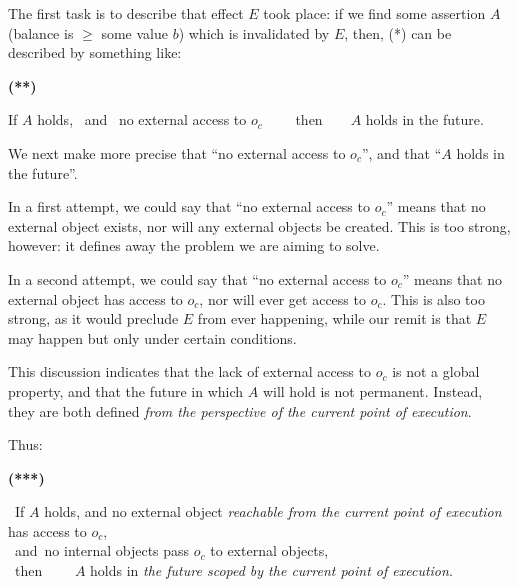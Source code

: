 
\noindent 
The first task is to describe that effect  $E$ took place: if we  find  some assertion $A$ (\eg  balance is $\geq$ some value $b$)
which is invalidated by $E$, then, (*) can be described by something like:

\vspace{.1cm}

  \begin{minipage}{.05\textwidth}
   \textbf{(**)}
\end{minipage}
\hfill
\begin{minipage}{.95\textwidth}
\begin{flushleft}
If $A$ holds, \  and \     no external access to  $o_c$ \ \ \ \ then\  \ \  \ $A$ holds in the future. 
\end{flushleft}
\end{minipage}

\vspace{.1cm}


\noindent 
We next make more precise that ``no external access to  $o_c$'', and that ``$A$ holds in the future''.

In a first attempt, we could say that ``no external access to  $o_c$'' means  that no external object exists, nor will any external objects be created.
This is too strong, however: it defines away the problem we are aiming to solve.

In a second attempt, we could say that ``no external access to  $o_c$'' means that no external object has access to $o_c$, nor will ever get access to $o_c$. This is also too strong, as it would preclude $E$ from ever happening, while our remit is that $E$ may happen but only under certain conditions. 

This discussion indicates that the lack of external access to $o_c$ is not a global property, and that the future in which  $A$ will hold is not permanent. 
Instead, they are both defined \emph{from the perspective of the current point of execution}.

Thus:


\vspace{.1cm}

  \begin{minipage}{.05\textwidth}
   \textbf{(***)}
\end{minipage}
\hfill
\begin{minipage}{.95\textwidth}
\begin{flushleft}
\ If $A$ holds,   and  no external object  \emph{reachable from the current point of execution}  has access to $o_c$, \\  
\   and\   no  internal objects pass $o_c$ to external objects,  \\
\ then \ \ \  \ $A$ holds in  \emph{the future scoped by the current point of execution}.  
\end{flushleft}
\end{minipage}

